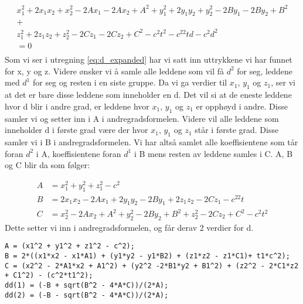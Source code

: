 \begin{multline}\label{eq:d_expanded}
    \\
    x_1^2+2x_1x_2+x_2^2-2Ax_1-2Ax_2+A^2+y_1^2+2y_1y_2+y_2^2-2By_1-2By_2+B^2\\
    +\\
    z_1^2+2z_1z_2+z_2^2-2Cz_1-2Cz_2+C^2-c^2t^2-c^22td-c^2d^2 \\
    = 0\\
\end{multline}
Som vi ser i utregning \ref{eq:d_expanded} har vi satt inn uttrykkene vi har funnet for x, y og z. Videre ønsker vi å samle alle leddene som vil få $d^2$ for seg, leddene med $d^1$ for seg og resten i en siste gruppe. Da vi ga verdier til $x_1$, $y_1$ og $z_1$, ser vi at det er bare disse leddene som inneholder en d. Det vil si at de eneste leddene hvor d blir i andre grad, er leddene hvor $x_1$, $y_1$ og $z_1$ er opphøyd i andre. Disse samler vi og setter inn i A i andregradsformelen. Videre vil alle leddene som inneholder d i første grad være der hvor $x_1$, $y_1$ og $z_1$ står i første grad. Disse samler vi i B i andregradsformelen. Vi har altså samlet alle koeffisientene som tår foran $d^2$ i A, koeffisientene foran $d^1$ i B mens resten av leddene samles i C. A, B og C blir da som følger: 

\begin{align}
    A&=x_1^2+y_1^2+z_1^2-c^2 \\
    B&=2x_1x_2-2Ax_1+2y_1y_2-2By_1+2z_1z_2-2Cz_1-c^22t\\
    C&=x_2^2-2Ax_2+A^2+y_2^2-2By_2+B^2+z_2^2-2Cz_2+C^2-c^2t^2
\end{align}
Dette setter vi inn i andregradsformelen, og får derav 2 verdier for d. 

\begin{lstlisting}
A = (x1^2 + y1^2 + z1^2 - c^2);
B = 2*((x1*x2 - x1*A1) + (y1*y2 - y1*B2) + (z1*z2 - z1*C1)+ t1*c^2);
C = (x2^2 - 2*A1*x2 + A1^2) + (y2^2 -2*B1*y2 + B1^2) + (z2^2 - 2*C1*z2 + C1^2) - (c^2*t1^2);
dd(1) = (-B + sqrt(B^2 - 4*A*C))/(2*A);
dd(2) = (-B - sqrt(B^2 - 4*A*C))/(2*A);
\end{lstlisting}